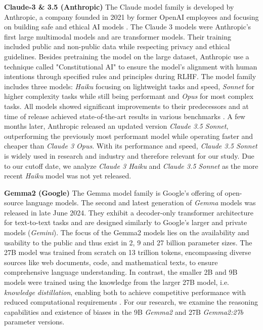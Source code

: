 \setlength{\parindent}{20pt}
\par \textbf{Claude-3 \& 3.5 (Anthropic)} The Claude model family is developed by Anthropic, a company founded in 2021 by former OpenAI employees and focusing on building safe and ethical AI models \parencite{oudin2024governance}. The Claude 3 models were Anthropic's first large multimodal models and are transformer models. Their training included public and non-public data while respecting privacy and ethical guidelines. Besides pretraining the model on the large dataset, Anthropic use a technique called "Constitutional AI" to ensure the model's alignment with human intentions through specified rules and principles during RLHF. The model family includes three models: \textit{Haiku} focusing on lightweight tasks and speed, \textit{Sonnet} for higher complexity tasks while still being performant and \textit{Opus} for most complex tasks. All models showed significant improvements to their predecessors and  at time of release achieved state-of-the-art results in various benchmarks \parencite{anthropic2024claude}. A few months later, Anthropic released an updated version \textit{Claude 3.5 Sonnet}, outperforming the previously most performant model while operating faster and cheaper than \textit{Claude 3 Opus}. With its performance and speed, \textit{Claude 3.5 Sonnet} is widely used in research and industry \parencite{anthropic2024claude2} and therefore relevant for our study. Due to our cutoff date, we analyze \textit{Claude 3 Haiku} and \textit{Claude 3.5 Sonnet} as the more recent \textit{Haiku} model was not yet released. 

\par \textbf{Gemma2 (Google)} The Gemma model family is Google's offering of open-source language models. The second and latest generation of \textit{Gemma} models was released in late June 2024. They exhibit a decoder-only transformer architecture for text-to-text tasks and are designed similarly to Google's larger and private models (\textit{Gemini}). The focus of the Gemma2 models lies on the availability and usability to the public and thus exist in 2, 9 and 27 billion parameter sizes. The 27B model was trained from scratch on 13 trillion tokens, encompassing diverse sources like web documents, code, and mathematical texts, to ensure comprehensive language understanding. In contrast, the smaller 2B and 9B models were trained using the knowledge from the larger 27B model, i.e. \textit{knowledge distillation}, enabling both to achieve competitive performance with reduced computational requirements \parencite{team2024gemma}. For our research, we examine the reasoning capabilities and existence of biases in the 9B \textit{Gemma2} and 27B \textit{Gemma2:27b} parameter versions.

